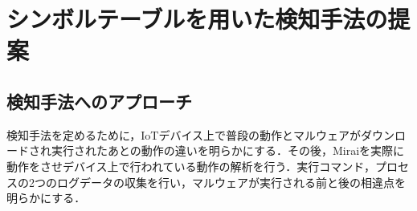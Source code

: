 \chapter{シンボルテーブルを用いた検知手法の提案}

\section{検知手法へのアプローチ}
検知手法を定めるために，IoTデバイス上で普段の動作とマルウェアがダウンロードされ実行されたあとの動作の違いを明らかにする．その後，Miraiを実際に動作をさせデバイス上で行われている動作の解析を行う．実行コマンド，プロセスの2つのログデータの収集を行い，マルウェアが実行される前と後の相違点を明らかにする．

